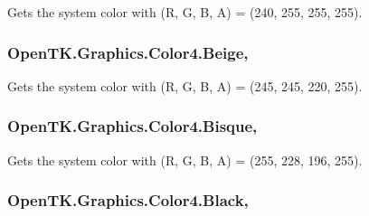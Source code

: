 Gets the system color with (R, G, B, A) = (240, 255, 255, 255). 

\hypertarget{struct_open_t_k_1_1_graphics_1_1_color4_a60ff8610cd6eb9ff5782d054342bed5e}{
\subsubsection[{Beige}]{ Open\-T\-K.\-Graphics.\-Color4.\-Beige\hspace{0.3cm}{\ttfamily [static]}, {\ttfamily [get]}}}\label{struct_open_t_k_1_1_graphics_1_1_color4_a60ff8610cd6eb9ff5782d054342bed5e}


Gets the system color with (R, G, B, A) = (245, 245, 220, 255). 

\hypertarget{struct_open_t_k_1_1_graphics_1_1_color4_ac72ef1694a5b0128c2acdda2b92d3022}{
\subsubsection[{Bisque}]{ Open\-T\-K.\-Graphics.\-Color4.\-Bisque\hspace{0.3cm}{\ttfamily [static]}, {\ttfamily [get]}}}\label{struct_open_t_k_1_1_graphics_1_1_color4_ac72ef1694a5b0128c2acdda2b92d3022}


Gets the system color with (R, G, B, A) = (255, 228, 196, 255). 

\hypertarget{struct_open_t_k_1_1_graphics_1_1_color4_a48fb74ebc3e66a4b6017f200f62b01a9}{
\subsubsection[{Black}]{ Open\-T\-K.\-Graphics.\-Color4.\-Black\hspace{0.3cm}{\ttfamily [static]}, {\ttfamily [get]}}}\label{struct_open_t_k_1_1_graphics_1_1_color4_a48fb74ebc3e66a4b6017f200f62b01a9}


